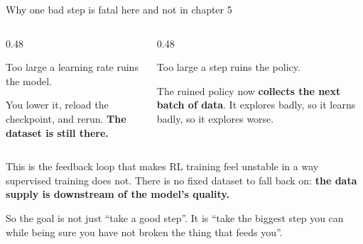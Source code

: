 \documentclass[aspectratio=169]{beamer}
\begin{document}
\begin{frame}{Why one bad step is fatal here and not in chapter 5}
  \begin{columns}[T]
    \begin{column}{0.48\textwidth}
      \begin{tcolorbox}[colback=armblue!8, colframe=armblue, boxrule=0.6pt, arc=2pt,
                        title={\textbf{Supervised learning}}]
        \small
        Too large a learning rate ruins the model.

        \vskip 4pt
        You lower it, reload the checkpoint, and rerun. \textbf{The dataset is still there.}
      \end{tcolorbox}
    \end{column}
    \begin{column}{0.48\textwidth}
      \begin{tcolorbox}[colback=armred!8, colframe=armred, boxrule=0.6pt, arc=2pt,
                        title={\textbf{Reinforcement learning}}]
        \small
        Too large a step ruins the policy.

        \vskip 4pt
        The ruined policy now \textbf{collects the next batch of data}. It explores badly, so it
        learns badly, so it explores worse.
      \end{tcolorbox}
    \end{column}
  \end{columns}

  \vskip 10pt
  \begin{tcolorbox}[colback=armorange!12, colframe=armorange, boxrule=0.7pt, arc=2pt]
    \small
    This is the feedback loop that makes RL training feel unstable in a way supervised training
    does not. There is no fixed dataset to fall back on: \textbf{the data supply is downstream
    of the model's quality.}

    \vskip 4pt
    So the goal is not just ``take a good step''. It is ``take the biggest step you can while
    being sure you have not broken the thing that feeds you''.
  \end{tcolorbox}
\end{frame}
\end{document}

